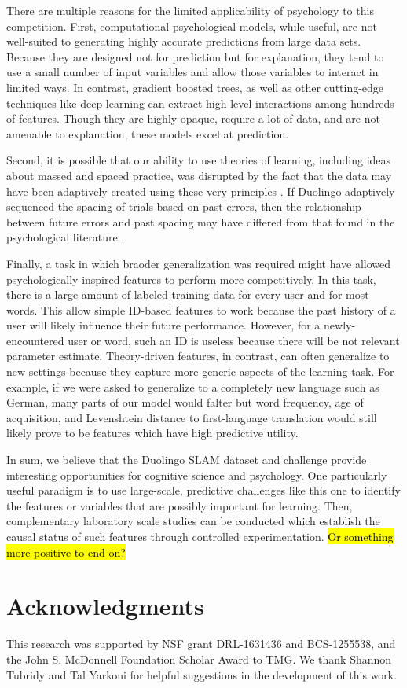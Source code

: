 \documentclass[11pt,a4paper]{article}
\begin{document}
There are multiple reasons for the limited applicability of psychology to this
competition. First, computational psychological models, while useful, are not
well-suited to generating highly accurate predictions from large data sets.
Because they are designed not for prediction but for explanation, they tend to
use a small number of input variables and allow those variables to interact
in limited ways. In contrast, gradient boosted trees, as well as other
cutting-edge techniques like deep learning can extract high-level
interactions among hundreds of features. Though they are highly opaque, require
a lot of data, and are not amenable to explanation, these models excel at prediction.

Second, it is possible that our ability to use theories of learning, including
ideas about massed and spaced practice, was disrupted by the fact that the data
may have been adaptively created using these very principles
\cite{settles2016trainable}. If Duolingo adaptively sequenced the spacing of
trials based on past errors, then the relationship between future errors and
past spacing may have differed from that found in the psychological literature
\cite{Cepeda:2006aa}.

Finally, a task in which braoder generalization was required might have
allowed psychologically inspired features to perform more competitively. In this
task, there is a large amount of labeled training data for every user and for
most words. This allow simple ID-based features to work because the past
history of a user will likely influence their future performance. However, for a
newly-encountered user or word, such an ID is useless because there will be
not relevant parameter estimate. Theory-driven features, in
contrast, can often generalize to new settings because they capture more
generic aspects of the learning task.  For example, if we were asked to generalize to
a completely new language such as German, many parts of our model would falter
but word frequency, age of acquisition, and Levenshtein distance to
first-language translation would still likely prove to be features which
have high predictive utility.

In sum, we believe that the Duolingo SLAM dataset and challenge provide
interesting opportunities for cognitive science and psychology.  One particularly
useful paradigm is to use large-scale, predictive challenges like this one
to identify the features or variables that are possibly important for learning.
Then, complementary laboratory scale studies can be conducted which
establish the causal status of such features through controlled experimentation.
\hl{Or something more positive to end on?}

\section{Acknowledgments}
This research was supported by NSF grant DRL-1631436 and BCS-1255538,
and the John S. McDonnell Foundation Scholar Award to TMG.  We thank
Shannon Tubridy and Tal Yarkoni for helpful suggestions in the development
of this work.



\end{document}
